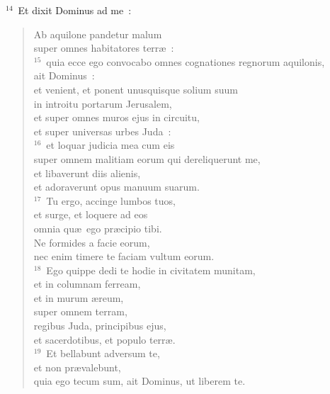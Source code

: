 ${}^{14}$~Et dixit Dominus ad me~: \begin{flushleft}\begin{verse}Ab aquilone pandetur malum\\ super omnes habitatores terr\ae~:\\
${}^{15}$~quia ecce ego convocabo omnes cognationes regnorum aquilonis,\\ ait Dominus~:\\ et venient, et ponent unusquisque solium suum\\ in introitu portarum Jerusalem,\\ et super omnes muros ejus in circuitu,\\ et super universas urbes Juda~:\\
${}^{16}$~et loquar judicia mea cum eis\\ super omnem malitiam eorum qui dereliquerunt me,\\ et libaverunt diis alienis,\\ et adoraverunt opus manuum suarum.\\
${}^{17}$~Tu ergo, accinge lumbos tuos,\\ et surge, et loquere ad eos\\ omnia qu\ae\ ego pr\ae cipio tibi.\\ Ne formides a facie eorum,\\ nec enim timere te faciam vultum eorum.\\
${}^{18}$~Ego quippe dedi te hodie in civitatem munitam,\\ et in columnam ferream,\\ et in murum \ae reum,\\ super omnem terram,\\ regibus Juda, principibus ejus,\\ et sacerdotibus, et populo terr\ae .\\
${}^{19}$~Et bellabunt adversum te,\\ et non pr\ae valebunt,\\ quia ego tecum sum, ait Dominus, ut liberem te.\end{verse}\end{flushleft}



